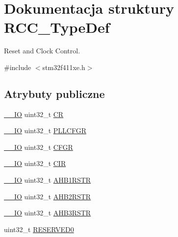 \hypertarget{struct_r_c_c___type_def}{}\section{Dokumentacja struktury R\+C\+C\+\_\+\+Type\+Def}
\label{struct_r_c_c___type_def}


Reset and Clock Control.  




{\ttfamily \#include $<$stm32f411xe.\+h$>$}

\subsection*{Atrybuty publiczne}
\begin{DoxyCompactItemize}
\item 
\hyperlink{core__sc300_8h_aec43007d9998a0a0e01faede4133d6be}{\+\_\+\+\_\+\+IO} uint32\+\_\+t \hyperlink{struct_r_c_c___type_def_abcb9ff48b9afb990283fefad0554b5b3}{CR}
\item 
\hyperlink{core__sc300_8h_aec43007d9998a0a0e01faede4133d6be}{\+\_\+\+\_\+\+IO} uint32\+\_\+t \hyperlink{struct_r_c_c___type_def_a2a7ccb4e23cb05a574f243f6278b7b26}{P\+L\+L\+C\+F\+GR}
\item 
\hyperlink{core__sc300_8h_aec43007d9998a0a0e01faede4133d6be}{\+\_\+\+\_\+\+IO} uint32\+\_\+t \hyperlink{struct_r_c_c___type_def_a0721b1b729c313211126709559fad371}{C\+F\+GR}
\item 
\hyperlink{core__sc300_8h_aec43007d9998a0a0e01faede4133d6be}{\+\_\+\+\_\+\+IO} uint32\+\_\+t \hyperlink{struct_r_c_c___type_def_aeadf3a69dd5795db4638f71938704ff0}{C\+IR}
\item 
\hyperlink{core__sc300_8h_aec43007d9998a0a0e01faede4133d6be}{\+\_\+\+\_\+\+IO} uint32\+\_\+t \hyperlink{struct_r_c_c___type_def_ad6abf71a348744aa3f2b7e8b214c1ca4}{A\+H\+B1\+R\+S\+TR}
\item 
\hyperlink{core__sc300_8h_aec43007d9998a0a0e01faede4133d6be}{\+\_\+\+\_\+\+IO} uint32\+\_\+t \hyperlink{struct_r_c_c___type_def_a343e0230ded55920ff2a04fbde0e5bcd}{A\+H\+B2\+R\+S\+TR}
\item 
\hyperlink{core__sc300_8h_aec43007d9998a0a0e01faede4133d6be}{\+\_\+\+\_\+\+IO} uint32\+\_\+t \hyperlink{struct_r_c_c___type_def_a39a90d838fbd0b8515f03e4a1be6374f}{A\+H\+B3\+R\+S\+TR}
\item 
uint32\+\_\+t \hyperlink{struct_r_c_c___type_def_a646631532167f3386763a2d10a881a04}{R\+E\+S\+E\+R\+V\+E\+D0}
\item 

\end{DoxyCompactItemize}
